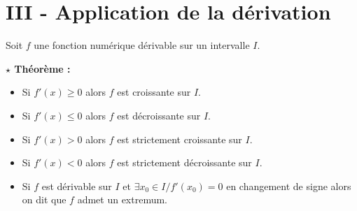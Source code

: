 \documentclass[12pt,a4paper]{article}
\begin{document}

\section*{III - Application de la dérivation}


\begin{tcolorbox}[
    colback=green!5,
    colframe=green!60!black,
    colbacktitle=green!60!black,
    title=\textbf{1 - Sens de variation},
    fonttitle=\bfseries,
    boxrule=0.8pt
]

Soit $f$ une fonction numérique dérivable sur un intervalle $I$.

\vspace{2mm}

\textbf{$\star$ Théorème :}

\begin{itemize}

    \item[$\text{---}$] Si $f'(x)\geq 0$ alors $f$ est croissante sur $I$.

    \item[$\text{---}$] Si $f'(x)\leq 0$ alors $f$ est décroissante sur $I$.

    \item[$\text{---}$] Si $f'(x)>0$ alors $f$ est strictement croissante sur $I$.

    \item[$\text{---}$] Si $f'(x)<0$ alors $f$ est strictement décroissante sur $I$.

    \item[$\text{---}$] Si $f$ est dérivable sur $I$ et
    $\exists x_0\in I/f'(x_0)=0$ en changement de signe alors on dit
    que $f$ admet un extremum.

\end{itemize}

\end{tcolorbox}

\end{document}
